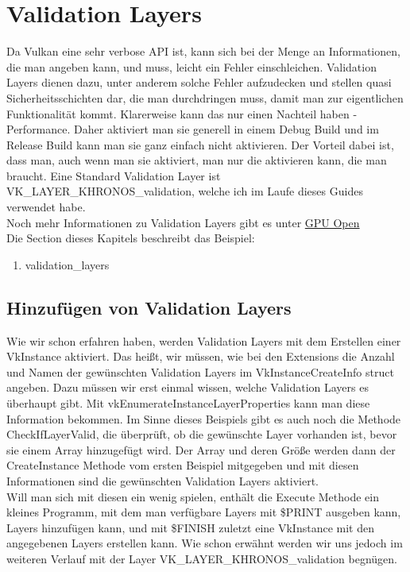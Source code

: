 \documentclass[11pt,a4paper]{report}
\begin{document}
\chapter{Validation Layers}
Da Vulkan eine sehr verbose API ist, kann sich bei der Menge an Informationen, die man angeben kann, und muss, leicht ein Fehler einschleichen. Validation Layers dienen dazu, unter anderem solche Fehler aufzudecken und stellen quasi Sicherheitsschichten dar, die man durchdringen muss, damit man zur eigentlichen Funktionalität kommt. Klarerweise kann das nur einen Nachteil haben - Performance. Daher aktiviert man sie generell in einem Debug Build und im Release Build kann man sie ganz einfach nicht aktivieren. Der Vorteil dabei ist, dass man, auch wenn man sie aktiviert, man nur die aktivieren kann, die man braucht. Eine Standard Validation Layer ist VK\_LAYER\_KHRONOS\_validation, welche ich im Laufe dieses Guides verwendet habe.\\
Noch mehr Informationen zu Validation Layers gibt es unter \href{https://gpuopen.com/using-the-vulkan-validation-layers/}{GPU Open}\\
Die Section dieses Kapitels beschreibt das Beispiel:
\begin{enumerate}
	\item validation\_layers
\end{enumerate}

\section{Hinzufügen von Validation Layers}
Wie wir schon erfahren haben, werden Validation Layers mit dem Erstellen einer VkInstance aktiviert. Das heißt, wir müssen, wie bei den Extensions die Anzahl und Namen der gewünschten Validation Layers im VkInstanceCreateInfo struct angeben. Dazu müssen wir erst einmal wissen, welche Validation Layers es überhaupt gibt. Mit vkEnumerateInstanceLayerProperties kann man diese Information bekommen. Im Sinne dieses Beispiels gibt es auch noch die Methode CheckIfLayerValid, die überprüft, ob die gewünschte Layer vorhanden ist, bevor sie einem Array hinzugefügt wird. Der Array und deren Größe werden dann der CreateInstance Methode vom ersten Beispiel mitgegeben und mit diesen Informationen sind die gewünschten Validation Layers aktiviert.\\
Will man sich mit diesen ein wenig spielen, enthält die Execute Methode ein kleines Programm, mit dem man verfügbare Layers mit \$PRINT ausgeben kann, Layers hinzufügen kann, und mit \$FINISH zuletzt eine VkInstance mit den angegebenen Layers erstellen kann. Wie schon erwähnt werden wir uns jedoch im weiteren Verlauf mit der Layer VK\_LAYER\_KHRONOS\_validation begnügen.
\end{document}
